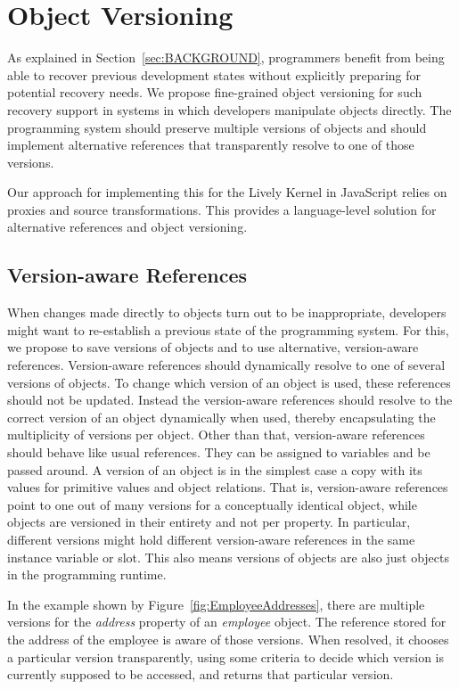 \chapter{Object Versioning} \label{sec:APPROACH}

As explained in Section~\ref{sec:BACKGROUND}, programmers benefit from being able to recover previous development states without explicitly preparing for potential recovery needs.
We propose fine-grained object versioning for such recovery support in systems in which developers manipulate objects directly.
The programming system should preserve multiple versions of objects and should implement alternative references that transparently resolve to one of those versions.

Our approach for implementing this for the Lively Kernel in JavaScript relies on proxies and source transformations.
This provides a language-level solution for alternative references and object versioning.


\section{Version-aware References}

When changes made directly to objects turn out to be inappropriate, developers might want to re-establish a previous state of the programming system.
For this, we propose to save versions of objects and to use alternative, version-aware references.
Version-aware references should dynamically resolve to one of several versions of objects.
To change which version of an object is used, these references should not be updated.
Instead the version-aware references should resolve to the correct version of an object dynamically when used, thereby encapsulating the multiplicity of versions per object.
Other than that, version-aware references should behave like usual references.
They can be assigned to variables and be passed around.
A version of an object is in the simplest case a copy with its values for primitive values and object relations.
That is, version-aware references point to one out of many versions for a conceptually identical object, while objects are versioned in their entirety and not per property.
In particular, different versions might hold different version-aware references in the same instance variable or slot.
This also means versions of objects are also just objects in the programming runtime.

In the example shown by Figure~\ref{fig:EmployeeAddresses}, there are multiple versions for the \emph{address} property of an \emph{employee} object.
The reference stored for the address of the employee is aware of those versions.
When resolved, it chooses a particular version transparently, using some criteria to decide which version is currently supposed to be accessed, and returns that particular version.

